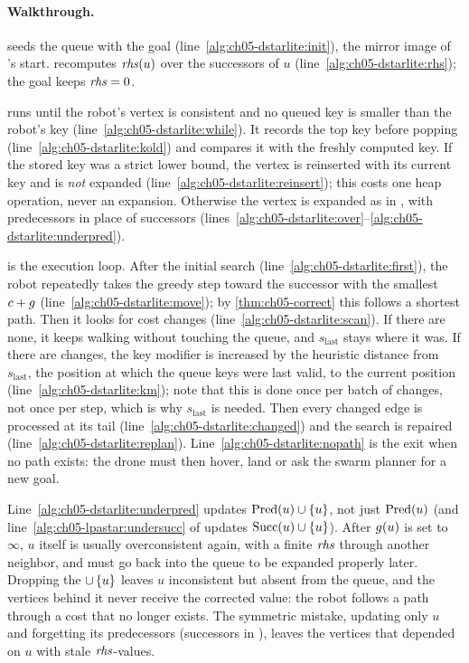\paragraph{Walkthrough.}
\DslInitialize seeds the queue with the goal (line~\ref{alg:ch05-dstarlite:init}), the
mirror image of \lpastar's start. \DslUpdateVertex recomputes $\mathit{rhs}(u)$ over the
successors of $u$ (line~\ref{alg:ch05-dstarlite:rhs}); the goal keeps $\mathit{rhs}=0$.

\DslComputeShortestPath runs until the robot's vertex is consistent and no queued key
is smaller than the robot's key (line~\ref{alg:ch05-dstarlite:while}). It records the
top key before popping (line~\ref{alg:ch05-dstarlite:kold}) and compares it with the
freshly computed key. If the stored key was a strict lower bound, the vertex is
reinserted with its current key and is \emph{not} expanded
(line~\ref{alg:ch05-dstarlite:reinsert}); this costs one heap operation, never an
expansion. Otherwise the vertex is expanded as in \lpastar, with predecessors in place of
successors (lines~\ref{alg:ch05-dstarlite:over}--\ref{alg:ch05-dstarlite:underpred}).

\DslMain is the execution loop. After the initial search (line~\ref{alg:ch05-dstarlite:first}),
the robot repeatedly takes the greedy step toward the successor with the smallest
$c + g$ (line~\ref{alg:ch05-dstarlite:move}); by \cref{thm:ch05-correct} this
follows a shortest path. Then it looks for cost changes (line~\ref{alg:ch05-dstarlite:scan}).
If there are none, it keeps walking without touching the queue, and $s_{\mathrm{last}}$
stays where it was. If there are changes, the key modifier is increased by the
heuristic distance from $s_{\mathrm{last}}$, the position at which the queue keys were
last valid, to the current position (line~\ref{alg:ch05-dstarlite:km}); note that this
is done once per batch of changes, not once per step, which is why $s_{\mathrm{last}}$
is needed. Then every changed edge is processed at its tail
(line~\ref{alg:ch05-dstarlite:changed}) and the search is repaired
(line~\ref{alg:ch05-dstarlite:replan}). Line~\ref{alg:ch05-dstarlite:nopath} is the
exit when no path exists: the drone must then hover, land or ask the swarm planner for
a new goal.

\begin{pitfall}
Line~\ref{alg:ch05-dstarlite:underpred} updates $\operatorname{Pred}(u) \cup \left\{ u \right\}$, not just
$\operatorname{Pred}(u)$ (and line~\ref{alg:ch05-lpastar:undersucc} of \lpastar updates
$\operatorname{Succ}(u)\cup\left\{ u \right\}$). After $g(u)$ is set to $\infty$, $u$ itself is usually
overconsistent again, with a finite $\mathit{rhs}$ through another neighbor, and must go back
into the queue to be expanded properly later. Dropping the $\cup\left\{ u \right\}$ leaves $u$
inconsistent but absent from the queue, and the vertices behind it never receive the
corrected value: the robot follows a path through a cost that no longer exists. The
symmetric mistake, updating only $u$ and forgetting its predecessors (successors in
\lpastar), leaves the vertices that depended on $u$ with stale $\mathit{rhs}$-values.
\end{pitfall}

